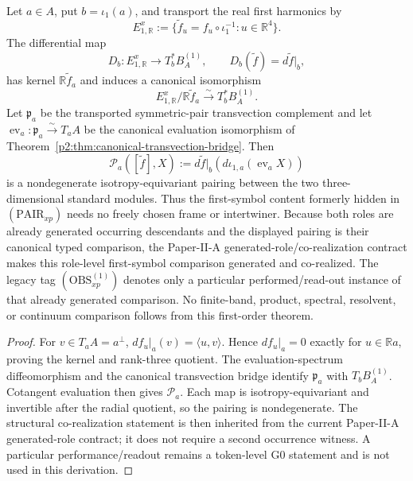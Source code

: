 \documentclass[12pt,a4paper]{article}
\begin{document}
\begin{theorem}
\label{p2c:thm:first-symbol-pairing}
Let \(a\in A\), put \(b=\iota_1(a)\), and transport the real first
harmonics by
\[
 E_{1,\mathbb R}^{x}
 :=\{\widetilde f_u=f_u\circ\iota_1^{-1}:u\in\mathbb R^4\}.
\]
The differential map
\[
 D_b:E_{1,\mathbb R}^{x}\longrightarrow T_b^*B_A^{(1)},
 \qquad D_b(\widetilde f)=d\widetilde f|_b,
\]
has kernel \(\mathbb R\widetilde f_a\) and induces a canonical isomorphism
\begin{equation}
\label{p2c:eq:first-symbol-radial-quotient}
 E_{1,\mathbb R}^{x}/\mathbb R\widetilde f_a
 \xrightarrow{\ \sim\ }T_b^*B_A^{(1)}.
\end{equation}
Let \(\mathfrak p_a\) be the transported symmetric-pair transvection
complement and let
\(\operatorname{ev}_a:\mathfrak p_a\xrightarrow{\sim}T_aA\) be the
canonical evaluation isomorphism of
Theorem~\ref{p2:thm:canonical-transvection-bridge}.  Then
\begin{equation}
\label{p2c:eq:first-symbol-transvection-pairing}
 \mathcal P_a([\widetilde f],X)
 :=d\widetilde f|_b\!\left(
 d\iota_{1,a}(\operatorname{ev}_aX)\right)
\end{equation}
is a nondegenerate isotropy-equivariant pairing between the two
three-dimensional standard modules.  Thus the first-symbol content formerly
hidden in \((\mathrm{PAIR}_{xp})\) needs no freely chosen frame or
intertwiner.  Because both roles are already generated occurring descendants
and the displayed pairing is their canonical typed comparison, the
Paper-II-A generated-role/co-realization contract makes this role-level
first-symbol comparison generated and co-realized.  The legacy tag
\((\mathrm{OBS}^{(1)}_{xp})\) denotes only a particular performed/read-out
instance of that already generated comparison.  No finite-band, product,
spectral, resolvent, or continuum comparison follows from this first-order
theorem.
\end{theorem}

\begin{proof}
For \(v\in T_aA=a^\perp\),
\(df_u|_a(v)=\langle u,v\rangle\).  Hence \(df_u|_a=0\) exactly for
\(u\in\mathbb Ra\), proving the kernel and rank-three quotient.  The
evaluation-spectrum diffeomorphism and the canonical transvection bridge
identify \(\mathfrak p_a\) with \(T_bB_A^{(1)}\).  Cotangent evaluation then
gives \(\mathcal P_a\).  Each map is isotropy-equivariant and invertible
after the radial quotient, so the pairing is nondegenerate.  The structural
co-realization statement is then inherited from the current Paper-II-A
generated-role contract; it does not require a second occurrence witness.  A
particular performance/readout remains a token-level G0 statement and is not
used in this derivation.
\end{proof}
\end{document}
